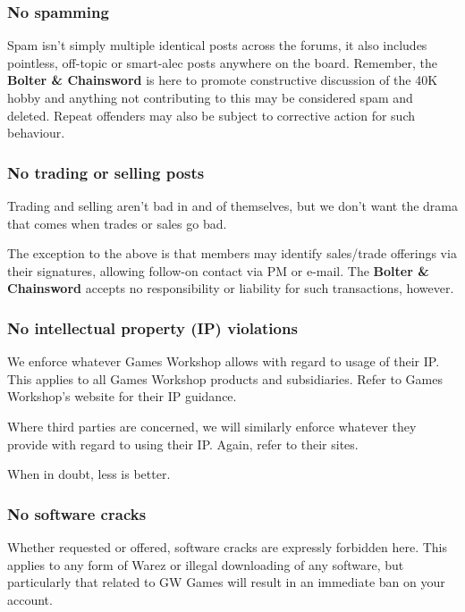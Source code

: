 \documentclass[12pt]{article}
\newcommand{\bnc}{{\textbf{Bolter \& Chainsword}}}%
\begin{document}
\subsubsection{No spamming}

Spam isn't simply multiple identical posts across the forums, it also 
includes pointless, off-topic or smart-alec posts anywhere on the 
board. Remember, the {\bnc} is here to promote constructive discussion of 
the 40K hobby and anything not contributing to this may be considered 
spam and deleted. Repeat offenders may also be subject to corrective 
action for such behaviour.

\subsubsection{No trading or selling posts}

Trading and selling aren't bad in and of themselves, but we don't want 
the drama that comes when trades or sales go bad.

The exception to the above is that members may identify sales/trade 
offerings via their signatures, allowing follow-on contact via PM or 
e-mail. The {\bnc} accepts no responsibility or liability for such 
transactions, however.

\subsubsection{No intellectual property (IP) violations}

We enforce whatever Games Workshop allows with regard to usage of their 
IP. This applies to all Games Workshop products and subsidiaries. Refer 
to Games Workshop's website for their IP guidance.

Where third parties are concerned, we will similarly enforce whatever 
they provide with regard to using their IP. Again, refer to their sites.

When in doubt, less is better.

\subsubsection{No software cracks}

Whether requested or offered, software cracks are expressly forbidden 
here. This applies to any form of Warez or illegal downloading of any 
software, but particularly that related to GW Games will result in an 
immediate ban on your account.
\end{document}
